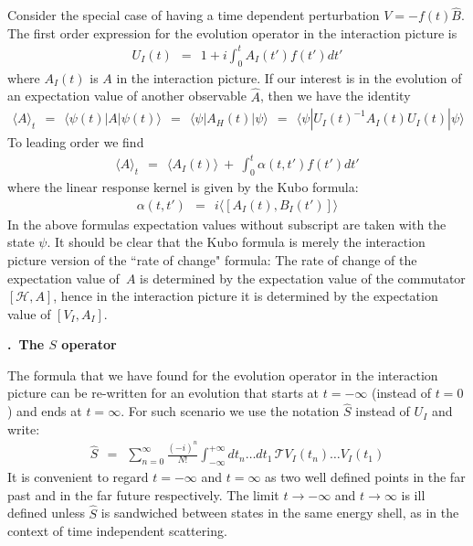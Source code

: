 \documentclass[onecolumn,fleqn, 11pt]{revtex4}
\newcommand{\beq}{\begin{eqnarray}}
\newcommand{\eeq}{\end{eqnarray}}
\renewcommand{\thesubsection}{\arabic{subsection}}
\renewcommand{\thesubsubsection}{\arabic{subsubsection}}
\newcommand{\sheadC}[1]
{
\addtocounter{subsubsection}{1}
\vspace{5mm}
{\bf \thesubsection.\thesubsubsection \ #1}  
\nopagebreak
\phantomsection
}
\begin{document}
Consider the special case of having 
a time dependent perturbation $V=-f(t)\hat{B}$. 
The first order expression for the 
evolution operator in the interaction picture is  
\beq
U_I(t) \ \ = \ \ 1 + i\int_{0}^{t} A_I(t') f(t')dt' 
\eeq
where $A_I(t)$ is $A$ in the interaction picture. 
If our interest is in the evolution of an expectation value 
of another observable $\hat{A}$, then we have the identity
\beq
\langle A \rangle_t  
\ \ = \ \ 
\langle\psi(t)|A|\psi(t)\rangle 
\ \ = \ \ 
\langle\psi|A_H(t)|\psi\rangle
\ \ = \ \ 
\langle\psi|U_I(t)^{-1} A_I(t) U_I(t)|\psi\rangle
\eeq
To leading order we find 
\beq
\langle A \rangle_t  
\ \ = \ \ 
\langle A_I(t) \rangle \ + \ \int_0^t \alpha(t,t') f(t') dt'
\eeq
where the linear response kernel 
is given by the Kubo formula: 
\beq
\alpha(t,t') \ \ = \ \ 
i\langle[A_I(t),B_I(t')]\rangle
\eeq
In the above formulas expectation values 
without subscript are taken with the state $\psi$. 
It should be clear that the Kubo formula is 
merely the interaction picture version 
of the ``rate of change" formula: 
The rate of change of the expectation value of~$A$ 
is determined by the expectation value of 
the commutator $[\mathcal{H},A]$, hence in 
the interaction picture it is determined 
by the expectation value of $[V_I,A_I]$. 



\sheadC{The $S$ operator}

The formula that we have found for the evolution 
operator in the interaction picture can 
be re-written for an evolution that starts 
at ${t=-\infty}$ (instead of $t=0$) and ends at ${t=\infty}$. 
For such scenario we use the notation $\hat{S}$ 
instead of $U_I$ and write: 
\beq
\hat{S} \ \ = \ \ 
\sum_{n=0}^{\infty}\frac{(-i)^{n}}{N!} 
\int_{-\infty}^{+\infty} dt_{n}\dots dt_{1} \, \mathcal{T} V_I(t_{n})\dots V_I(t_{1})
\eeq
It is convenient to regard ${t=-\infty}$ and ${t=\infty}$ 
as two well defined points in the far past and in the 
far future respectively. The limit 
${t\rightarrow-\infty}$ and  ${t\rightarrow\infty}$ 
is ill defined unless $\hat{S}$ is sandwiched 
between states in the same energy shell, 
as in the context of time independent scattering. 
\end{document}
